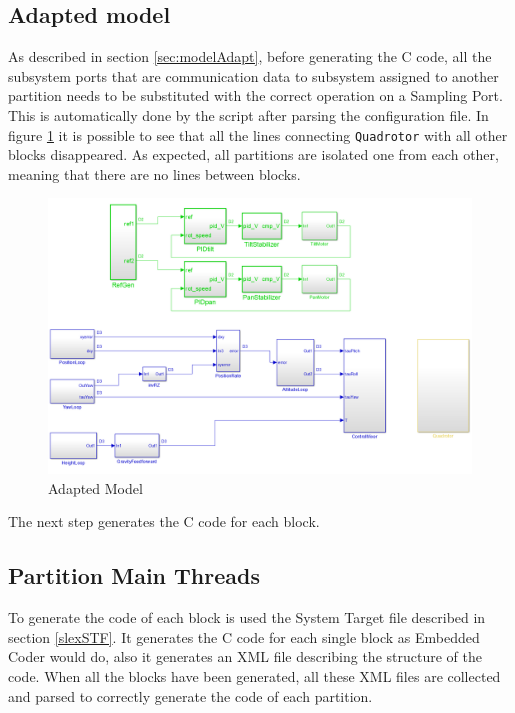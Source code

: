 \subsection{Adapted model}
As described in section \ref{sec:modelAdapt}, before generating the C code, all the subsystem ports that are communication data to subsystem assigned to another partition needs to be substituted with the correct operation on a Sampling Port. This is automatically done by the script after parsing the configuration file. In figure \ref{fig:adaptedModel} it is possible to see that all the lines connecting \verb|Quadrotor| with all other blocks disappeared. As expected, all partitions are isolated one from each other, meaning that there are no lines between blocks.
\begin{figure}[htbp] 
\centering    
\includegraphics[width=1\textwidth]{AdaptedModel}
\caption{Adapted Model}
\label{fig:adaptedModel}
\end{figure}
The next step generates the C code for each block.

\subsection{Partition Main Threads}
To generate the code of each block is used the System Target file described in section \ref{slexSTF}. It generates the C code for each single block as Embedded Coder would do, also it generates an XML file describing the structure of the code. When all the blocks have been generated, all these XML files are collected and parsed to correctly generate the code of each partition.

